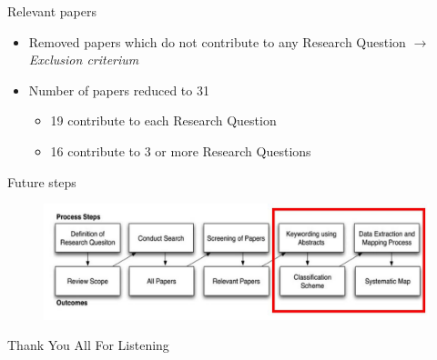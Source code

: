\documentclass{beamer}
\begin{document}
\begin{frame}{Relevant papers}
\begin{itemize}
	\item Removed papers which do not contribute to any Research Question $\rightarrow$ \textit{Exclusion criterium}
	\item Number of papers reduced to 31
	\begin{itemize}
		\item 19 contribute to each Research Question
		\item 16 contribute to 3 or more Research Questions
	\end{itemize}
\end{itemize}

\end{frame}

\begin{frame}{Future steps}
\begin{figure}
	\includegraphics[width=1.0\textwidth]{sms_part_marked_2}
\end{figure}
\end{frame}

\begin{frame}
  
\end{frame}

\begin{frame}
\begin{center}
	\huge{Thank You All For Listening}
\end{center}
\end{frame}
\end{document}
